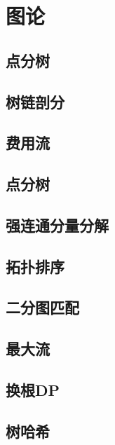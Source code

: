 \section{图论}

\subsection{点分树}


\subsection{树链剖分}


\subsection{费用流}


\subsection{点分树}


\subsection{强连通分量分解}


\subsection{拓扑排序}


\subsection{二分图匹配}


\subsection{最大流}


\subsection{换根DP}


\subsection{树哈希}

